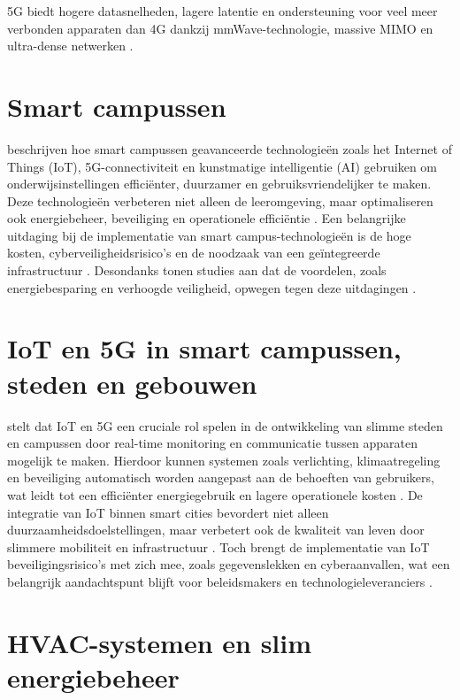 5G biedt hogere datasnelheden, lagere latentie en ondersteuning voor veel meer verbonden apparaten  dan 4G dankzij mmWave-technologie, massive MIMO en ultra-dense netwerken \autocite{Hui_2020}.


\section{Smart campussen}
\textcites{Min_Allah_2020,AbuAlnaaj2016,Ahmed2022} beschrijven hoe smart campussen geavanceerde technologieën zoals het Internet of Things (IoT), 5G-connectiviteit en kunstmatige intelligentie (AI) gebruiken om onderwijsinstellingen efficiënter, duurzamer en gebruiksvriendelijker te maken. Deze technologieën verbeteren niet alleen de leeromgeving, maar optimaliseren ook energiebeheer, beveiliging en operationele efficiëntie \autocite{Correia2022}. Een belangrijke uitdaging bij de implementatie van smart campus-technologieën is de hoge kosten, cyberveiligheidsrisico’s en de noodzaak van een geïntegreerde infrastructuur \autocite{Liu_2022}. Desondanks tonen studies aan dat de voordelen, zoals energiebesparing en verhoogde veiligheid, opwegen tegen deze uitdagingen \autocite{AbuAlnaaj2016}.

\section{IoT en 5G in smart campussen, steden en gebouwen}

\textcite{Bilardo_2021} stelt dat IoT en 5G een cruciale rol spelen in de ontwikkeling van slimme steden en campussen door real-time monitoring en communicatie tussen apparaten mogelijk te maken. Hierdoor kunnen systemen zoals verlichting, klimaatregeling en beveiliging automatisch worden aangepast aan de behoeften van gebruikers, wat leidt tot een efficiënter energiegebruik en lagere operationele kosten \autocite{Polin2023}. De integratie van IoT binnen smart cities bevordert niet alleen duurzaamheidsdoelstellingen, maar verbetert ook de kwaliteit van leven door slimmere mobiliteit en infrastructuur \autocite{Chew2020}. Toch brengt de implementatie van IoT beveiligingsrisico’s met zich mee, zoals gegevenslekken en cyberaanvallen, wat een belangrijk aandachtspunt blijft voor beleidsmakers en technologieleveranciers \autocite{Trivedi2017}.

\section{HVAC-systemen en slim energiebeheer}

